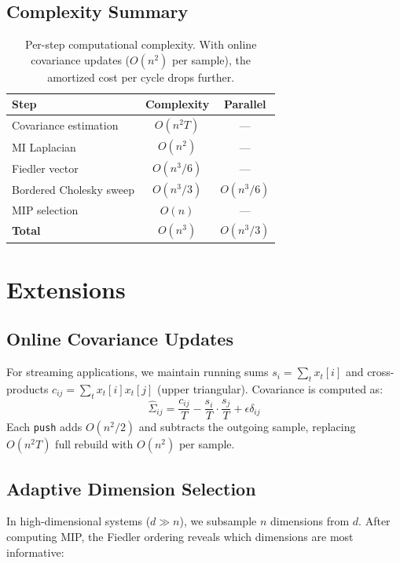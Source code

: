 \documentclass[10pt,letterpaper]{article}
\begin{document}
\subsection{Complexity Summary}

\begin{table}[h]
\centering
\begin{tabular}{lcc}
\toprule
\textbf{Step} & \textbf{Complexity} & \textbf{Parallel} \\
\midrule
Covariance estimation & $O(n^2 T)$ & --- \\
MI Laplacian & $O(n^2)$ & --- \\
Fiedler vector & $O(n^3/6)$ & --- \\
Bordered Cholesky sweep & $O(n^3/3)$ & $O(n^3/6)$ \\
MIP selection & $O(n)$ & --- \\
\midrule
\textbf{Total} & $O(n^3)$ & $O(n^3/3)$ \\
\bottomrule
\end{tabular}
\caption{Per-step computational complexity. With online covariance updates ($O(n^2)$ per sample), the amortized cost per cycle drops further.}
\end{table}

\section{Extensions}

\subsection{Online Covariance Updates}

For streaming applications, we maintain running sums $s_i = \sum_t x_t[i]$ and cross-products $c_{ij} = \sum_t x_t[i] x_t[j]$ (upper triangular). Covariance is computed as:
\begin{equation}
  \hat{\Sigma}_{ij} = \frac{c_{ij}}{T} - \frac{s_i}{T} \cdot \frac{s_j}{T} + \epsilon \delta_{ij}
\end{equation}
Each \texttt{push} adds $O(n^2/2)$ and subtracts the outgoing sample, replacing $O(n^2 T)$ full rebuild with $O(n^2)$ per sample.

\subsection{Adaptive Dimension Selection}

In high-dimensional systems ($d \gg n$), we subsample $n$ dimensions from $d$. After computing MIP, the Fiedler ordering reveals which dimensions are most informative:
\end{document}

